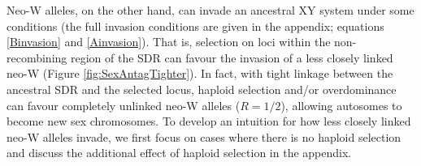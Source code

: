\documentclass[12pt]{article}
\begin{document}
Neo-W alleles, on the other hand, can invade an ancestral XY system under some conditions (the full invasion conditions are given in the appendix; equations \ref{Binvasion} and \ref{Ainvasion}). 
That is, selection on loci within the non-recombining region of the SDR can favour the invasion of a less closely linked neo-W (Figure \ref{fig:SexAntagTighter}). 
In fact, with tight linkage between the ancestral SDR and the selected locus, haploid selection and/or overdominance can favour completely unlinked neo-W alleles ($R=1/2$), allowing autosomes to become new sex chromosomes.
To develop an intuition for how less closely linked neo-W alleles invade, we first focus on cases where there is no haploid selection and discuss the additional effect of haploid selection in the appendix. 
\end{document}
